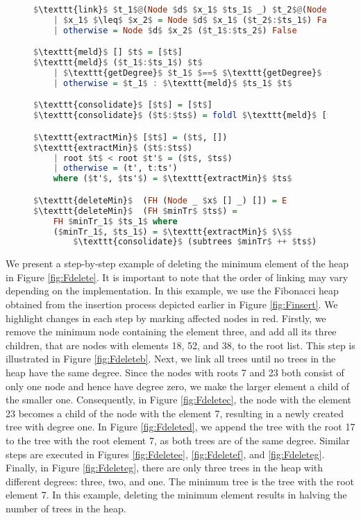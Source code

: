 \documentclass{clmthesis}
\begin{document}
\begin{figure}[h]
\begin{lstlisting}[mathescape=true, language=haskell, caption={Link, meld, consolidate, extract minimum and delete minimum functions.},captionpos=b, label=fig:Fcode2]
$\texttt{link}$ $t_1$@(Node $d$ $x_1$ $ts_1$ _) $t_2$@(Node _ $x_2$ $ts_2$ _)
	| $x_1$ $\leq$ $x_2$ = Node $d$ $x_1$ ($t_2$:$ts_1$) False
	| otherwise = Node $d$ $x_2$ ($t_1$:$ts_2$) False

$\texttt{meld}$ [] $t$ = [$t$]
$\texttt{meld}$ ($t_1$:$ts_1$) $t$ 
	| $\texttt{getDegree}$ $t_1$ $==$ $\texttt{getDegree}$ $t$ = $\texttt{meld}$ $ts_1$ ($\texttt{link}$ $t$ $t_1$)
	| otherwise = $t_1$ : $\texttt{meld}$ $ts_1$ $t$

$\texttt{consolidate}$ [$t$] = [$t$]
$\texttt{consolidate}$ ($t$:$ts$) = foldl $\texttt{meld}$ [$t$] $ts$

$\texttt{extractMin}$ [$t$] = ($t$, [])
$\texttt{extractMin}$ ($t$:$ts$)
	| root $t$ < root $t'$ = ($t$, $ts$) 
	| otherwise = (t', t:ts')
	where ($t'$, $ts'$) = $\texttt{extractMin}$ $ts$

$\texttt{deleteMin}$  (FH (Node _ $x$ [] _) []) = E
$\texttt{deleteMin}$  (FH $minTr$ $ts$) = 
	FH $minTr_1$ $ts_1$ where
	($minTr_1$, $ts_1$) = $\texttt{extractMin}$ $\$$ 
		$\texttt{consolidate}$ (subtrees $minTr$ ++ $ts$)
\end{lstlisting}
\end{figure}

We present a step-by-step example of deleting the minimum element of the heap in Figure \ref{fig:Fdelete}. It is important to note that the order of linking may vary depending on the implementation. In this example, we use the Fibonacci heap obtained from the insertion process depicted earlier in Figure \ref{fig:Finsert}. We highlight changes in each step by marking affected nodes in red.
Firstly, we remove the minimum node containing the element three, and add all its three children, that are nodes with elements 18, 52, and 38, to the root list. This step is illustrated in Figure \ref{fig:Fdeleteb}. Next, we link all trees until no trees in the heap have the same degree. Since the nodes with roots 7 and 23 both consist of only one node and hence have degree zero, we make the larger element a child of the smaller one. Consequently, in Figure \ref{fig:Fdeletec}, the node with the element 23 becomes a child of the node with the element 7, resulting in a newly created tree with degree one. In Figure \ref{fig:Fdeleted}, we append the tree with the root 17 to the tree with the root element 7, as both trees are of the same degree. Similar steps are executed in Figures \ref{fig:Fdeletee}, \ref{fig:Fdeletef}, and \ref{fig:Fdeleteg}.
Finally, in Figure \ref{fig:Fdeleteg}, there are only three trees in the heap with different degrees: three, two, and one. The minimum tree is the tree with the root element 7. In this example, deleting the minimum element results in halving the number of trees in the heap.
\end{document}
